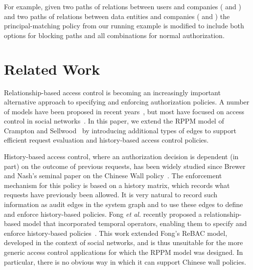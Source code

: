 \documentclass{article}
\begin{document}
For example, given two paths of relations between users and companies ( and ) and two paths of relations between data entities and companies ( and ) the principal-matching policy from our running example is modified to include both options for blocking paths and all combinations for normal authorization.



\section{Related Work}\label{sec:relatedwork}

Relationship-based access control is becoming an increasingly important alternative approach to specifying and enforcing authorization policies.
A number of models have been proposed in recent years~\cite{CarminatiFP09,ChengPS12passat,ChengPS12dbsec,CramptonS14,Fong11,ZhangAGC09}, but most have focused on access control in social networks~\cite{CarminatiFP09,ChengPS12passat,ChengPS12dbsec,Fong11,ZhangAGC09}.
In this paper, we extend the RPPM model of Crampton and Sellwood~\cite{CramptonS14} by introducing additional types of edges to support efficient request evaluation and history-based access control policies.

History-based access control, where an authorization decision is dependent (in part) on the outcome of previous requests, has been widely studied since Brewer and Nash's seminal paper on the Chinese Wall policy~\cite{BrewerN89}.
The enforcement mechanism for this policy is based on a history matrix, which records what requests have previously been allowed.
It is very natural to record such information as audit edges in the system graph and to use these edges to define and enforce history-based policies.
Fong {\em et al.} recently proposed a relationship-based model that incorporated temporal operators, enabling them to specify and enforce history-based policies~\cite{FoMeKr13}.
This work extended Fong's ReBAC model, developed in the context of social networks, and is thus unsuitable for the more generic access control applications for which the RPPM model was designed.
In particular, there is no obvious way in which it can support Chinese wall policies.
\end{document}
